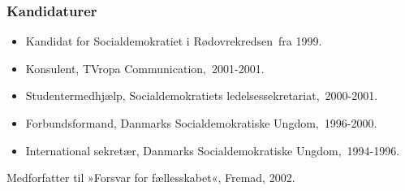 \documentclass[11pt, a4paper]{awesome-cv}
\begin{document}
\begin{cvletter}
\subsubsection*{Kandidaturer}
\begin{itemize}
\item Kandidat for Socialdemokratiet i Rødovrekredsen fra 1999.
\end{itemize}
\begin{itemize}
\item Konsulent, TVropa Communication, 2001-2001.
\item Studentermedhjælp, Socialdemokratiets ledelsessekretariat, 2000-2001.
\item Forbundsformand, Danmarks Socialdemokratiske Ungdom, 1996-2000.
\item International sekretær, Danmarks Socialdemokratiske Ungdom, 1994-1996.
\end{itemize}
Medforfatter til »Forsvar for fællesskabet«, Fremad, 2002.

\end{cvletter}
\end{document}
